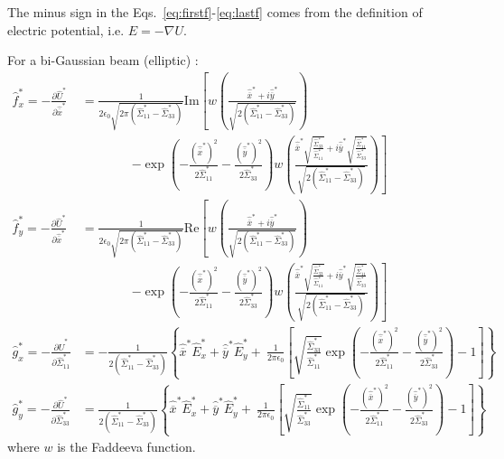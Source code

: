 The minus sign in the Eqs.~\ref{eq:firstf}-\ref{eq:lastf} comes from the definition of electric potential, i.e. $E=-\nabla U$.


For a bi-Gaussian beam (elliptic) \cite{hirata1}:
\begin{align}
\hat{f}^*_x = -\frac{\partial \hat{U}^*}{\partial \hat{\overline{x}}^*} &= \frac{1}{2 \epsilon_0 \sqrt{2 \pi \left(\hat{\Sigma}^*_{11}-\hat{\Sigma}^*_{33}\right)}} \textrm{Im} \left[w\left(\frac{\hat{\overline{x}}^*+i \hat{\overline{y}}^*}{\sqrt{2 \left(\hat{\Sigma}^*_{11}-\hat{\Sigma}^*_{33}\right)}}\right) \right.
\nonumber \\
&\qquad\qquad\left.
- \exp \left(-\frac{(\hat{\overline{x}}^*)^2}{2\hat{\Sigma}^*_{11}}-\frac{(\hat{\overline{y}}^*)^2}{2\hat{\Sigma}^*_{33}}\right) w\left(\frac{\hat{\overline{x}}^*\sqrt{\frac{\hat{\Sigma}^*_{33}}{\hat{\Sigma}^*_{11}}}+i \hat{\overline{y}}^*\sqrt{\frac{\hat{\Sigma}^*_{11}}{\hat{\Sigma}^*_{33}}}}{\sqrt{2 \left(\hat{\Sigma}^*_{11}-\hat{\Sigma}^*_{33}\right)}}\right)
\right]\\
\hat{f}^*_y  = -\frac{\partial \hat{U}^*}{\partial \hat{\overline{x}}^*} &= \frac{1}{2 \epsilon_0 \sqrt{2 \pi \left(\hat{\Sigma}^*_{11}-\hat{\Sigma}^*_{33}\right)}} \textrm{Re} \left[w\left(\frac{\hat{\overline{x}}^*+i \hat{\overline{y}}^*}{\sqrt{2 \left(\hat{\Sigma}^*_{11}-\hat{\Sigma}^*_{33}\right)}}\right) \right.
\nonumber \\
&\qquad\qquad\left.
- \exp \left(-\frac{(\hat{\overline{x}}^*)^2}{2\hat{\Sigma}^*_{11}}-\frac{(\hat{\overline{y}}^*)^2}{2\hat{\Sigma}^*_{33}}\right) w\left(\frac{\hat{\overline{x}}^*\sqrt{\frac{\hat{\Sigma}^*_{33}}{\hat{\Sigma}^*_{11}}}+i \hat{\overline{y}}^*\sqrt{\frac{\hat{\Sigma}^*_{11}}{\hat{\Sigma}^*_{33}}}}{\sqrt{2 \left(\hat{\Sigma}^*_{11}-\hat{\Sigma}^*_{33}\right)}}\right)
\right]\\
\hat{g}^*_x = -\frac{\partial \hat{U}^*}{\partial \hat{\Sigma}^*_{11}} &= -\frac{1}{2 \left(\hat{\Sigma}^*_{11}-\hat{\Sigma}^*_{33}\right)}
 \left\{\hat{\overline{x}}^* \hat{E}^*_x  + \hat{\overline{y}}^* \hat{E}^*_y +\
 \frac{1}{2 \pi \epsilon_0}\left[\sqrt{\frac{\hat{\Sigma}^*_{33}}{\hat{\Sigma}^*_{11}}}  \exp \left(-\frac{(\hat{\overline{x}}^*)^2}{2\hat{\Sigma}^*_{11}}-\frac{(\hat{\overline{y}}^*)^2}{2\hat{\Sigma}^*_{33}}\right)   -1 \right]\right\}\\
\hat{g}^*_y =  -\frac{\partial \hat{U}^*}{\partial \hat{\Sigma}^*_{33}} &= \frac{1}{2 \left(\hat{\Sigma}^*_{11}-\hat{\Sigma}^*_{33}\right)}
 \left\{\hat{\overline{x}}^* \hat{E}^*_x  + \hat{\overline{y}}^* \hat{E}^*_y +\
 \frac{1}{2 \pi \epsilon_0}\left[\sqrt{\frac{\hat{\Sigma}^*_{11}}{\hat{\Sigma}^*_{33}}}  \exp \left(-\frac{(\hat{\overline{x}}^*)^2}{2\hat{\Sigma}^*_{11}}-\frac{(\hat{\overline{y}}^*)^2}{2\hat{\Sigma}^*_{33}}\right)   -1 \right]\right\}
\end{align}
where $w$ is the Faddeeva function.
 

